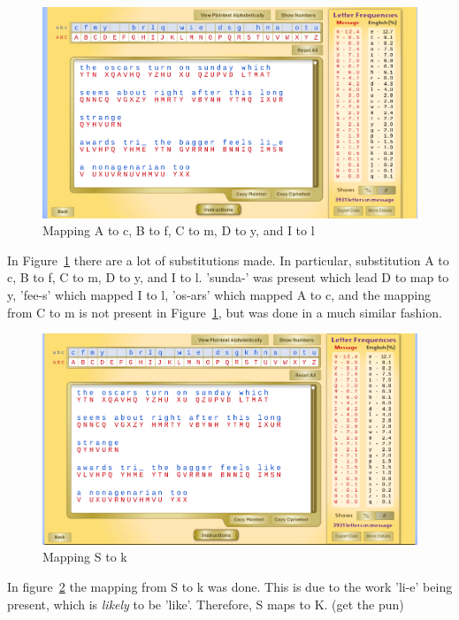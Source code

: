 \documentclass[12pt]{article}
\begin{document}
\begin{figure}[H]
    \begin{center}
        \includegraphics[scale=0.48]{c12.png}
    \end{center}{}
    \caption{Mapping A to c, B to f, C to m, D to y, and I to l}
    \label{fig:c12}
\end{figure}

In Figure~\ref{fig:c12} there are a lot of substitutions made. In particular, substitution A to c, B to f, C to m, D to
y, and I to l. 'sunda-' was present which lead D to map to y, 'fee-s' which mapped I to l, 'os-ars' which mapped A to c,
and the mapping from C to m is not present in Figure~\ref{fig:c12}, but was done in a much similar fashion.

\begin{figure}[H]
    \begin{center}
        \includegraphics[scale=0.48]{c13.png}
    \end{center}{}
    \caption{Mapping S to k}
    \label{fig:c13}
\end{figure}

In figure~\ref{fig:c13} the mapping from S to k was done. This is due to the work 'li-e' being present, which is
\emph{likely} to be 'like'. Therefore, S maps to K. (get the pun)
\end{document}
